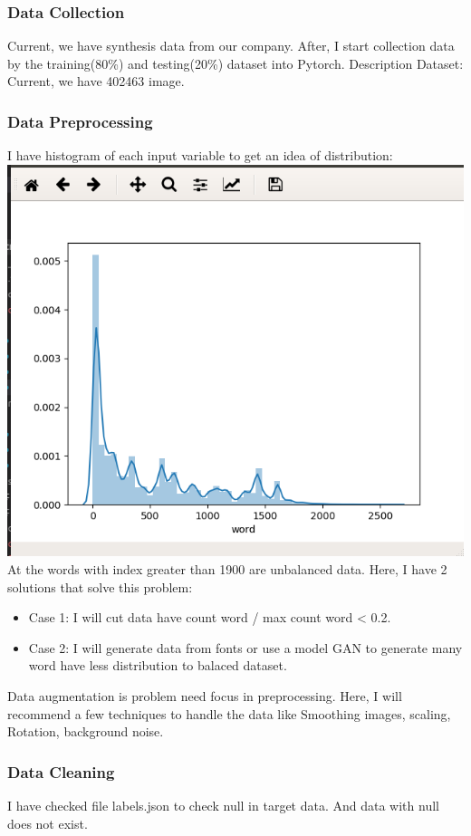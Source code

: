 \documentclass[14pt]{extarticle}
\newcommand{\<}{\langle}
\renewcommand{\>}{\rangle}
\theoremstyle{definition}
\begin{document}
\subsubsection{Data Collection}
Current, we have synthesis data from our company. After, I start collection data by the training(80\%) and testing(20\%) dataset into Pytorch.
Description Dataset: Current, we have 402463 image.
\subsubsection{Data Preprocessing}
I have histogram of each input variable to get an idea of distribution: \newline
\includegraphics[width=170mm,scale=0.7]{hist.png}
At the words with index greater than 1900 are unbalanced data. Here, I have 2 solutions that solve this problem: 
\begin{itemize}
    \item Case 1: I will cut data have count word / max count word < 0.2. 
    \item Case 2: I will generate data from fonts or use a model GAN to generate many word have less distribution to balaced dataset. 
\end{itemize}
Data augmentation is problem need focus in preprocessing. Here, I will recommend a few techniques to handle the data like Smoothing images, scaling, Rotation, background noise. \subsubsection{Data Cleaning}
I have checked file labels.json to check null in target data. And data with null does not exist. 
\end{document}
